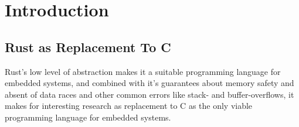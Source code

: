 
\chapter{Introduction}
\label{chap:intro}

\section{Rust as Replacement To C} %
\label{sec:intro:rust_as_replacement_to_c}


Rust's low level of abstraction makes it a suitable programming language for embedded systems, and
combined with it's guarantees about memory safety and absent of data races and other common errors
like stack- and buffer-overflows, it makes for interesting research as replacement to C as the only
viable programming language for embedded systems.

